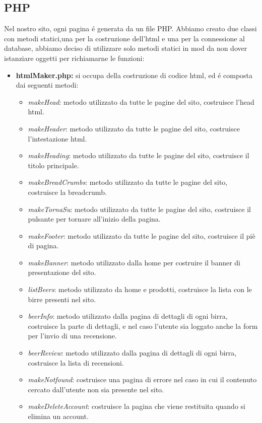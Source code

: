 \subsection{PHP}
Nel nostro sito, ogni pagina é generata da un file PHP.
Abbiamo creato due classi con metodi statici,una per la costruzione dell'html e una per la connessione al database, abbiamo deciso di utilizzare solo metodi statici in mod da non dover istanziare oggetti per richiamarne le funzioni:
\begin{itemize}
\item \textbf{htmlMaker.php:} si occupa della costruzione di codice html, ed é composta dai seguenti metodi:
	\begin{itemize}
		\item \textit{makeHead}: metodo utilizzato da tutte le pagine del sito, costruisce l'head html.
		\item \textit{makeHeader}: metodo utilizzato da tutte le pagine del sito, costruisce l'intestazione html.
		\item \textit{makeHeading}: metodo utilizzato da tutte le pagine del sito, costruisce il titolo principale.
		\item \textit{makeBreadCrumbs}: metodo utilizzato da tutte le pagine del sito, costruisce la breadcrumb.
		\item \textit{makeTornaSu}: metodo utilizzato da tutte le pagine del sito, costruisce il pulsante per tornare all'inizio della pagina.
		\item \textit{makeFooter}: metodo utilizzato da tutte le pagine del sito, costruisce il piè di pagina.
		\item \textit{makeBanner}: metodo utilizzato dalla home per costruire il banner di presentazione del sito.
		\item \textit{listBeers}: metodo utilizzato da home e prodotti, costruisce la lista con le birre presenti nel sito.
		\item \textit{beerInfo}: metodo utilizzato dalla pagina di dettagli di ogni birra, costruisce la parte di dettagli, e nel caso l'utente sia loggato anche la form per l'invio di una recensione. 
		\item \textit{beerReview}: metodo utilizzato dalla pagina di dettagli di ogni birra, costruisce la lista di recensioni.
		\item \textit{makeNotfound}: costruisce una pagina di errore nel caso in cui il contenuto cercato dall'utente non sia presente nel sito.
		\item \textit{makeDeleteAccount}: costruisce la pagina che viene restituita quando si elimina un account.

\end{itemize}
\end{itemize}
